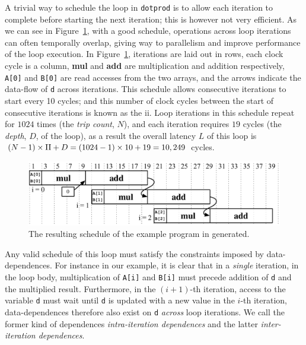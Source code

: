 A trivial way to schedule the loop in \verb|dotprod| is to allow each iteration
to complete before starting the next iteration; this is however not very
efficient.  As we can see in Figure~\ref{bg:fig:schedule}, with a good
schedule, operations across loop iterations can often temporally overlap,
giving way to parallelism and improve performance of the loop execution.  In
Figure~\ref{bg:fig:schedule}, iterations are laid out in rows, each clock cycle
is a column, \textbf{mul} and \textbf{add} are multiplication and addition
respectively, \verb|A[0]| and \verb|B[0]| are read accesses from the two
arrays, and the arrows indicate the data-flow of \verb|d| across iterations.
This schedule allows consecutive iterations to start every 10 cycles; and this
number of clock cycles between the start of consecutive iterations is known
as the \gls{ii}\@.  Loop iterations in this schedule repeat for $1024$ times
(the \emph{trip count}, $N$), and each iteration requires $19$ cycles (the
\emph{depth}, $D$, of the loop), as a result the overall latency $L$ of this
loop is $(N - 1) \times \mathrm{II} + D = (1024 - 1) \times 10 + 19 = 10,249$ cycles.
\begin{figure}[ht]
    \centering
    \includegraphics[width=0.8\linewidth]{bg/fig/schedule}
    \caption{%
        The resulting schedule of the example program in generated.
    }\label{bg:fig:schedule}
\end{figure}

Any valid schedule of this loop must satisfy the constraints imposed by
data-dependences.  For instance in our example, it is clear that in a
\emph{single} iteration, in the loop body, multiplication of \verb|A[i]|
and \verb|B[i]| must precede addition of \verb|d| and the multiplied
result.  Furthermore, in the $(i + 1)$-th iteration, access to the variable
\verb|d| must wait until \verb|d| is updated with a new value in the $i$-th
iteration, data-dependences therefore also exist on \verb|d| \emph{across}
loop iterations.  We call the former kind of dependences \emph{intra-iteration
dependences} and the latter \emph{inter-iteration dependences}.

